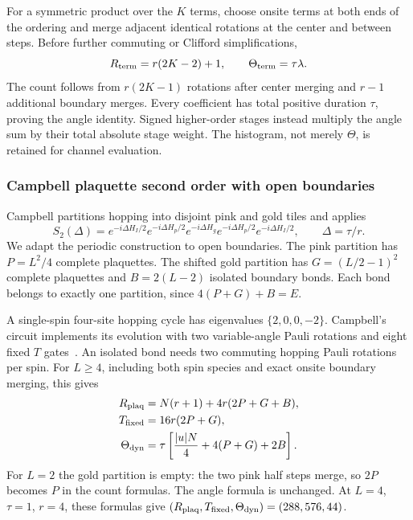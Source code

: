 \documentclass[11pt]{article}
\begin{document}
For a symmetric product over the $K$ terms, choose onsite terms at both ends
of the ordering and merge adjacent identical rotations at the center and
between steps. Before further commuting or Clifford simplifications,
\begin{equation}\label{eq:termwise-v0}
 R_{\rm term}=r(2K-2)+1,\qquad \Theta_{\rm term}=\tau\lambda.
\end{equation}
The count follows from $r(2K-1)$ rotations after center merging and $r-1$
additional boundary merges. Every coefficient has total positive duration
$\tau$, proving the angle identity. Signed higher-order stages instead
multiply the angle sum by their total absolute stage weight. The histogram,
not merely $\Theta$, is retained for channel evaluation.

\subsubsection{Campbell plaquette second order with open boundaries}
Campbell partitions hopping into disjoint pink and gold tiles and applies
\begin{equation}\label{eq:plaq-v0}
 S_2(\Delta)=e^{-i\Delta H_I/2}e^{-i\Delta H_p/2}
 e^{-i\Delta H_g}e^{-i\Delta H_p/2}e^{-i\Delta H_I/2},
 \qquad \Delta=\tau/r.
\end{equation}
We adapt the periodic construction to open boundaries. The pink partition
has $P=L^2/4$ complete plaquettes. The shifted gold partition has
$G=(L/2-1)^2$ complete plaquettes and $B=2(L-2)$ isolated boundary bonds.
Each bond belongs to exactly one partition, since $4(P+G)+B=E$.

A single-spin four-site hopping cycle has eigenvalues $\{2,0,0,-2\}$.
Campbell's circuit implements its evolution with two variable-angle Pauli
rotations and eight fixed $T$ gates~\cite[Appendix E.1]{campbell}. An isolated
bond needs two commuting hopping Pauli rotations per spin. For $L\geq4$,
including both spin species and exact onsite boundary merging, this gives
\begin{align}
 R_{\rm plaq}&=N(r+1)+4r(2P+G+B),\\
 T_{\rm fixed}&=16r(2P+G),\\
 \Theta_{\rm dyn}&=\tau\left[\frac{|u|N}{4}+4(P+G)+2B\right].\label{eq:plaqangle-v0}
\end{align}
For $L=2$ the gold partition is empty: the two pink half steps merge, so
$2P$ becomes $P$ in the count formulas. The angle formula is unchanged.
At $L=4$, $\tau=1$, $r=4$, these formulas give
$(R_{\rm plaq},T_{\rm fixed},\Theta_{\rm dyn})=(288,576,44)$.
\end{document}
